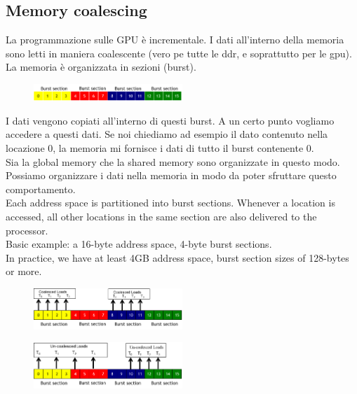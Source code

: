 \inputminted{c}{cuda/MatrixMultiplication_shared.cu}

\subsection{Memory coalescing}
La programmazione sulle GPU è incrementale.
I dati all'interno della memoria sono letti in maniera coalescente (vero pe tutte le ddr, e soprattutto per le gpu).\\
La memoria è organizzata in sezioni (burst).

\begin{figure}[ht]
	\centering
	\includegraphics[width=0.5\textwidth]{figure_parallel/memory_coalescing2.png}
\end{figure}

I dati vengono copiati all'interno di questi burst. A un certo punto vogliamo accedere a questi dati. Se noi chiediamo ad esempio il dato contenuto nella locazione 0, la memoria mi fornisce i dati di tutto il burst contenente 0.\\
Sia la global memory che la shared memory sono organizzate in questo modo. Possiamo organizzare i dati nella memoria in modo da poter sfruttare questo comportamento.\\

Each address space is partitioned into burst sections. Whenever a location is accessed, all other locations in the same section are also
delivered to the processor.\\
Basic example: a 16-byte address space, 4-byte burst sections.\\
In practice, we have at least 4GB address space, burst section sizes of 128-bytes or more.

\begin{figure}[ht]
	\centering
	\includegraphics[width=0.5\textwidth]{figure_parallel/memory_coalescing.png}
\end{figure}

\begin{figure}[ht]
	\centering
	\includegraphics[width=0.5\textwidth]{figure_parallel/memory_coalescing1.png}
\end{figure}
\FloatBarrier

